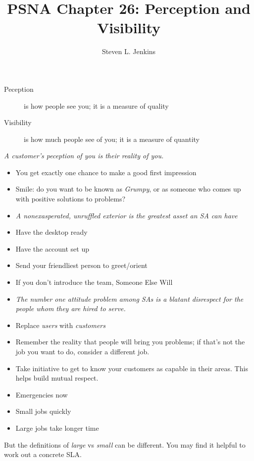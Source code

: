 \documentclass{slides}
\title{PSNA Chapter 26: Perception and Visibility}
\author{Steven L. Jenkins}
\newcommand{\bi}{\begin{itemize}}
\newcommand{\ei}{\end{itemize}}
\newcommand{\bd}{\begin{description}}
\newcommand{\ed}{\end{description}}
\begin{document}

\bd
\item[Peception] is how people see you; it is a measure of quality
\item[Visibility] is how much people see of you; it is a measure
  of quantity
\ed

\emph{A customer's peception of you is their reality of you.}


\bi
\item You get exactly one chance to make a good first impression
\item Smile: do you want to be known as \emph{Grumpy}, or as someone
  who comes up with positive solutions to problems?
\item \emph{A nonexasperated, unruffled exterior is the greatest asset an
  SA can have}
\ei


\bi
\item Have the desktop ready
\item Have the account set up
\item Send your friendliest person to greet/orient
\item If you don't introduce the team, Someone Else Will
\ei


\bi
\item \emph{The number one attitude problem among SAs is a blatant disrespect
for the people whom they are hired to serve.}
\item Replace \emph{users} with \emph{customers}
\item Remember the reality that people will bring you problems; if that's
  not the job you want to do, consider a different job.
\item Take initiative to get to know your customers as capable in their
  areas.  This helps build mutual respect.
\ei


\bi
\item Emergencies now
\item Small jobs quickly
\item Large jobs take longer time
\ei

But the definitions of \emph{large} vs \emph{small} can be 
different.  You may find it helpful to work out a concrete SLA.

\end{document}
